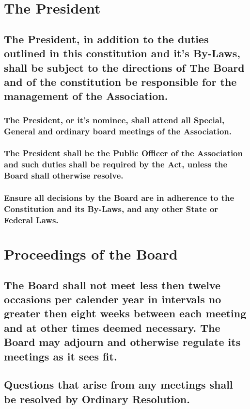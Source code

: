 \documentclass{article}
\newenvironment{subs}
  {\adjustwidth{2em}{0pt}}
  {\endadjustwidth}
\begin{document}
\begin{subs}
\begin{subs}
\section{The President}
\begin{subs}
\subsection{The President, in addition to the duties outlined in this constitution and it’s By-Laws, shall be subject to the directions of The Board and of the constitution be responsible for the management of the Association.}
\begin{subs}
\subsubsection{The President, or it’s nominee, shall attend all Special, General and ordinary board meetings of the Association.}
\subsubsection{The President shall be the Public Officer of the Association and such duties shall be required by the Act, unless the Board shall otherwise resolve.}
\subsubsection{Ensure all decisions by the Board are in adherence to the Constitution and its By-Laws, and any other State or Federal Laws.}
\end{subs}
\end{subs}

\section{Proceedings of the Board}
\begin{subs}
\subsection{The Board shall not meet less then twelve occasions per calender year in intervals no greater then eight weeks between each meeting and at other times deemed necessary. The Board may adjourn and otherwise regulate its meetings as it sees fit.}
\subsection{Questions that arise from any meetings shall be resolved by Ordinary Resolution.}
\end{subs}
\newpage


\end{subs}
\end{subs}
\end{document}
